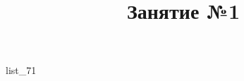 \documentclass[12pt, a4paper]{article}
\begin{document}
	\title{Занятие №1}
	{list_71}
\end{document}
